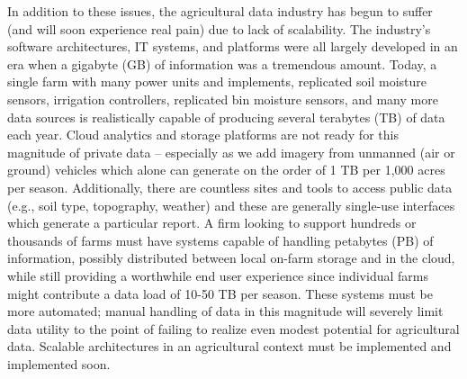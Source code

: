 \documentclass[11pt]{article}
\begin{document}
In addition to these issues, the agricultural data industry has begun to suffer (and will soon experience real pain) due to lack 
of scalability.  The industry's software architectures, IT systems, and platforms were all largely developed in an era when a 
gigabyte (GB) of information was a tremendous amount.  Today, a single farm with many power units and implements, 
replicated soil moisture sensors, irrigation controllers, replicated bin moisture sensors, and many more data sources is 
realistically capable of producing several terabytes (TB) of data each year.  Cloud analytics and storage platforms are not ready for this 
magnitude of private data -- especially as we add imagery from unmanned (air or ground) vehicles which alone can generate 
on the order of 1 TB per 1,000 acres per season.  Additionally, there are countless sites and tools to access public data 
(e.g., soil type, topography, weather) and these are generally single-use interfaces which generate a particular report.  
A firm looking to support hundreds or thousands of farms must have systems capable of handling petabytes (PB) of 
information, possibly distributed between local on-farm storage and in the cloud, while still providing a worthwhile end 
user experience since individual farms might contribute a data load of 10-50 TB per season. These systems must be more 
automated; manual handling of data in this magnitude will severely limit data utility to the point of failing to realize even 
modest potential for agricultural data. Scalable architectures in an agricultural context must be implemented and implemented 
soon.
\end{document}
